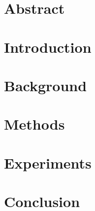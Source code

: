 \section{Abstract}\label{sgpdsec:abs}
	

\section{Introduction}\label{sgpdsec:int}
	

\section{Background}\label{sgpdsec:bac}
	

\section{Methods}\label{sgpdsec:met}
	

\section{Experiments}\label{sgpdsec:exp}
	

\section{Conclusion}\label{sgpdsec:con}
	